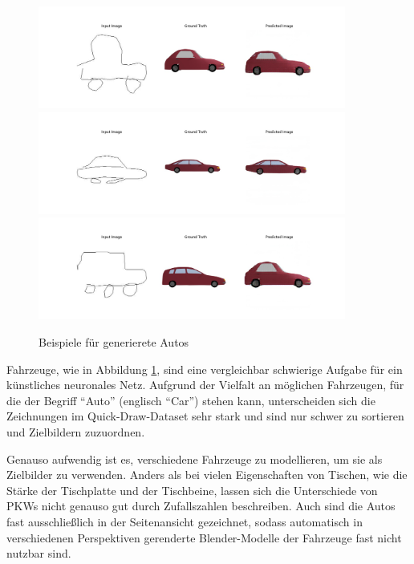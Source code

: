\begin{figure}[h]
	\centering
	\includegraphics[width=0.9\textwidth]{bilder/pix2pix_progress/car_small.png}
	\includegraphics[width=0.9\textwidth]{bilder/pix2pix_progress/car_limo.png}
	\includegraphics[width=0.9\textwidth]{bilder/pix2pix_progress/car_kombi.png}
	\caption[Generierte Autos]{Beispiele für generierete Autos}
	\label{fig:pix2pixcars}
\end{figure}

Fahrzeuge, wie in Abbildung \ref{fig:pix2pixcars}, sind eine vergleichbar schwierige Aufgabe für ein künstliches neuronales Netz. Aufgrund der Vielfalt an möglichen Fahrzeugen, für die der Begriff ``Auto'' (englisch ``Car'') stehen kann, unterscheiden sich die Zeichnungen im Quick-Draw-Dataset sehr stark und sind nur schwer zu sortieren und Zielbildern zuzuordnen.

Genauso aufwendig ist es, verschiedene Fahrzeuge zu modellieren, um sie als Zielbilder zu verwenden. Anders als bei vielen Eigenschaften von Tischen, wie die Stärke der Tischplatte und der Tischbeine, lassen sich die Unterschiede von PKWs nicht genauso gut durch Zufallszahlen beschreiben. Auch sind die Autos fast ausschließlich in der Seitenansicht gezeichnet, sodass automatisch in verschiedenen Perspektiven gerenderte Blender-Modelle der Fahrzeuge fast nicht nutzbar sind.

